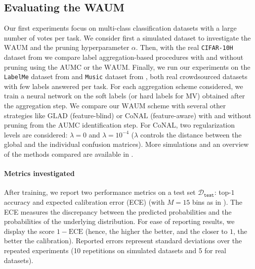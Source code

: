 \subsection{Evaluating the WAUM}
\label{subsec:evaluate}

Our first experiments focus on multi-class classification datasets with a large number of votes per task.
We consider first a simulated dataset to investigate the $\mathrm{WAUM}$ and the pruning hyperparameter $\alpha$.
Then, with the real \texttt{CIFAR-10H} dataset from \citet{peterson_human_2019} we compare label aggregation-based procedures with and without pruning using the $\mathrm{AUMC}$ or the $\mathrm{WAUM}$.
Finally, we run our experiments on the \texttt{LabelMe} dataset from \citet{rodrigues2018deep} and \texttt{Music} dataset from \citet{rodrigues2014gaussian}, both real crowdsourced datasets with few labels answered per task.
For each aggregation scheme considered, we train a neural network on the soft labels (or hard labels for MV) obtained after the aggregation step.
We compare our $\mathrm{WAUM}$ scheme with several other strategies like $\mathrm{GLAD}$ (feature-blind) or $\mathrm{CoNAL}$ (feature-aware) with and without pruning from the $\mathrm{AUMC}$ identification step.
For $\mathrm{CoNAL}$, two regularization levels are considered: $\lambda=0$ and $\lambda=10^{-4}$ ($\lambda$ controls the distance between the global and the individual confusion matrices).
More simulations and an overview of the methods compared are available in .

\paragraph*{Metrics investigated}
After training, we report two performance metrics on a test set $\mathcal{D}_{\texttt{test}}$: top-$1$ accuracy and expected calibration error (ECE) (with $M=15$ bins as in \citet{guo_calibration_2017}).
The ECE measures the discrepancy between the predicted probabilities and the probabilities of the underlying distribution.
For ease of reporting results, we display the score $1-\mathrm{ECE}$ (hence, the higher the better, and the closer to $1$, the better the calibration).
Reported errors represent standard deviations over the repeated experiments (10 repetitions on simulated datasets and 5 for real datasets).

